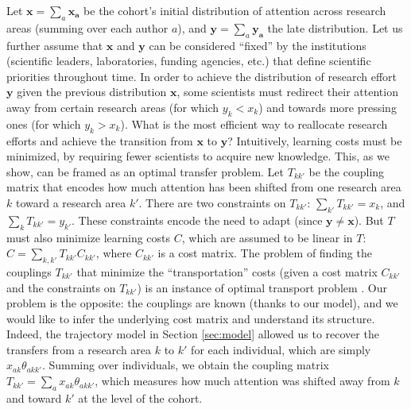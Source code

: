 \documentclass{article}
\begin{document}
Let $\bm{x}=\sum_a \bm{x_a}$ be the cohort's initial distribution of attention across research areas (summing over each author $a$), and $\bm{y}=\sum_a \bm{y_a}$ the late distribution. Let us further assume that $\bm{x}$ and $\bm{y}$ can be considered ``fixed'' by the institutions (scientific leaders, laboratories, funding agencies, etc.) that define scientific priorities throughout time. In order to achieve the distribution of research effort $\bm{y}$ given the previous distribution $\bm{x}$, some scientists must redirect their attention away from certain research areas (for which $y_k<x_k$) and towards more pressing ones (for which $y_k>x_k$). What is the most efficient way to reallocate research efforts and achieve the transition from $\bm{x}$ to $\bm{y}$? Intuitively, learning costs must be minimized, by requiring fewer scientists to acquire new knowledge. This, as we show, can be framed as an optimal transfer problem. Let $T_{kk'}$ be the coupling matrix that encodes how much attention has been shifted from one research area $k$ toward a research area $k'$. There are two constraints on $T_{kk'}$: $\sum_{k'} T_{kk'} = x_k$, and $\sum_{k} T_{kk'} = y_{k'}$. These constraints encode the need to adapt (since $\bm{y}\neq \bm{x}$). But $T$ must also minimize learning costs $C$, which are assumed to be linear in $T$: $C=\sum_{k,k'}T_{kk'}C_{kk'}$, where $C_{kk'}$ is a cost matrix. The problem of finding the couplings $T_{kk'}$ that minimize the ``transportation'' costs (given a cost matrix $C_{kk'}$ and the constraints on $T_{kk'}$) is an instance of optimal transport problem \citep{Peyre2018}. Our problem is the opposite: the couplings are known (thanks to our model), and we would like to infer the underlying cost matrix and understand its structure. Indeed, the trajectory model in Section \ref{sec:model} allowed us to recover the transfers from a research area $k$ to $k'$ for each individual, which are simply $x_{ak}\theta_{akk'}$. Summing over individuals, we obtain the coupling matrix $T_{kk'}=\sum_a x_{ak} \theta_{akk'}$, which measures how much attention was shifted away from $k$ and toward $k'$ at the level of the cohort.
\end{document}
